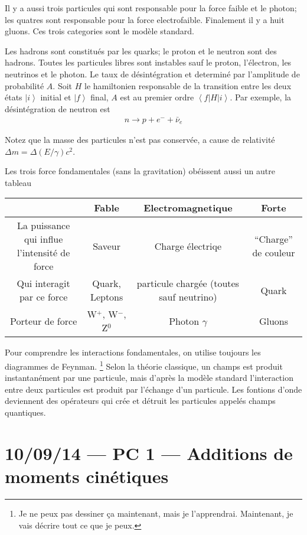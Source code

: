 \documentclass[10pt]{report}
\newcommand{\bra}[1]{\left<#1\right|}
\newcommand{\ket}[1]{\left|#1\right>}
\begin{document}
Il y a aussi trois particules qui sont responsable pour la force faible et le photon; les quatres sont responsable pour la force electrofaible. Finalement il y a huit gluons. Ces trois categories sont le mod\`ele standard.

Les hadrons sont constitu\'es par les quarks; le proton et le neutron sont des hadrons. Toutes les particules libres sont instables sauf le proton, l'\'electron, les neutrinos et le photon. Le taux de d\'esint\'egration et determin\'e par l'amplitude de probabilit\'e $A$. Soit $H$ le hamiltonien responsable de la transition entre les deux \'etats $\ket{i}$ initial et $\ket{f}$ final, $A$ est au premier ordre $\bra{f}H\ket{i}$. Par exemple, la d\'esint\'egration de neutron est
\begin{align}
    n \to p + e^- + \bar{\nu}_e
\end{align}

Notez que la masse des particules n'est pas conserv\'ee, a cause de relativit\'e $\Delta m = \Delta(E/\gamma) c^2$.

Les trois force fondamentales (sans la gravitation) ob\'eissent aussi un autre tableau
\begin{table}[!h]
    \centering
    \begin{tabular}{c|c|c|c}
        &Fable & Electromagnetique & Forte\\\hline
        La puissance qui influe l'intensit\'e de force &Saveur & Charge \'electriqe & ``Charge'' de couleur\\
        Qui interagit par ce force &Quark, Leptons & particule charg\'ee (toutes sauf neutrino) & Quark\\
        Porteur de force & W$^+$, W$^-$, Z$^0$ & Photon $\gamma$ & Gluons\\
    \end{tabular}
\end{table}

Pour comprendre les interactions fondamentales, on utilise toujours les diagrammes de Feynman. \footnote{Je ne peux pas dessiner \c{c}a maintenant, mais je l'apprendrai. Maintenant, je vais d\'ecrire tout ce que je peux.} Selon la th\'eorie classique, un champs est produit instantan\'ement par une particule, mais d'apr\`es la mod\`ele standard l'interaction entre deux particules est produit par l'\'echange d'un particule. Les fontions d'onde deviennent des op\'erateurs qui cr\'ee et d\'etruit les particules appel\'es champs quantiques. 

\chapter{10/09/14 --- PC 1 --- Additions de moments cin\'etiques}
\end{document}
